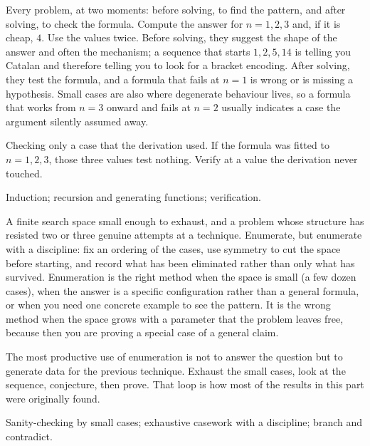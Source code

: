 \cue Every problem, at two moments: before solving, to find the pattern, and after solving, to check the formula.
\method Compute the answer for $n=1,2,3$ and, if it is cheap, $4$. Use the values twice. Before solving, they suggest the shape of the answer and often the mechanism; a sequence that starts $1,2,5,14$ is telling you Catalan and therefore telling you to look for a bracket encoding. After solving, they test the formula, and a formula that fails at $n=1$ is wrong or is missing a hypothesis. Small cases are also where degenerate behaviour lives, so a formula that works from $n=3$ onward and fails at $n=2$ usually indicates a case the argument silently assumed away.

\begin{trap}
Checking only a case that the derivation used. If the formula was fitted to $n=1,2,3$, those three values test nothing. Verify at a value the derivation never touched.
\end{trap}

\begin{seealsob}Induction; recursion and generating functions; verification.\end{seealsob}

\cue A finite search space small enough to exhaust, and a problem whose structure has resisted two or three genuine attempts at a technique.
\method Enumerate, but enumerate with a discipline: fix an ordering of the cases, use symmetry to cut the space before starting, and record what has been eliminated rather than only what has survived. Enumeration is the right method when the space is small (a few dozen cases), when the answer is a specific configuration rather than a general formula, or when you need one concrete example to see the pattern. It is the wrong method when the space grows with a parameter that the problem leaves free, because then you are proving a special case of a general claim.

\begin{keynote}
The most productive use of enumeration is not to answer the question but to generate data for the previous technique. Exhaust the small cases, look at the sequence, conjecture, then prove. That loop is how most of the results in this part were originally found.
\end{keynote}

\begin{seealsob}Sanity-checking by small cases; exhaustive casework with a discipline; branch and contradict.\end{seealsob}


